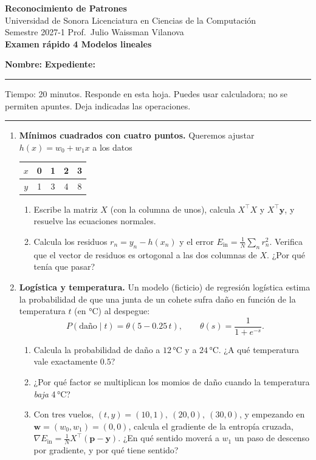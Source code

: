 \documentclass[11pt]{article}
\newcommand{\Ein}{E_{\text{in}}}
\newcommand{\vw}{\mathbf{w}}
\newcommand{\vy}{\mathbf{y}}
\newcommand{\T}{^{\top}}
\newcommand{\encabezado}[2]{%
\begin{center}
{\large\bfseries Reconocimiento de Patrones}\\[2pt]
Universidad de Sonora \textperiodcentered{} Licenciatura en Ciencias de la Computación\\
Semestre 2027-1 \textperiodcentered{} Prof.\ Julio Waissman Vilanova\\[10pt]
{\Large\bfseries #1}%
\ifdefined\tipodoc\\[4pt]{\large\itshape\tipodoc}\fi
\end{center}
\ifdefined\tipodoc\else
\vspace{6pt}
\textbf{Nombre:} \hrulefill\quad \textbf{Expediente:} \rule{3.5cm}{0.4pt}\par
\vspace{6pt}
\fi
#2
\par\medskip\hrule\medskip
}
\newcommand{\espacio}[1]{\par\vspace{#1}}
\newcommand{\nuevapagina}{\newpage}
\begin{document}
\encabezado{Examen rápido 4 \textperiodcentered{} Modelos lineales}{%
Tiempo: 20 minutos. Responde en esta hoja. Puedes usar calculadora; no se permiten apuntes. Deja indicadas las operaciones.}

\begin{enumerate}

\item \textbf{Mínimos cuadrados con cuatro puntos.} Queremos ajustar $h(x) = w_0 + w_1 x$ a los datos
\begin{center}
\begin{tabular}{c|cccc}
$x$ & 0 & 1 & 2 & 3 \\ \hline
$y$ & 1 & 3 & 4 & 8
\end{tabular}
\end{center}
\begin{enumerate}
  \item Escribe la matriz $X$ (con la columna de unos), calcula $X\T X$ y $X\T \vy$, y resuelve las ecuaciones normales.
  \espacio{4.5cm}

  \item Calcula los residuos $r_n = y_n - h(x_n)$ y el error $\Ein = \frac1N \sum_n r_n^2$. Verifica que el vector de residuos es ortogonal a las dos columnas de $X$. ¿Por qué tenía que pasar?
  \espacio{4cm}
\end{enumerate}

\nuevapagina
\item \textbf{Logística y temperatura.} Un modelo (ficticio) de regresión logística estima la probabilidad de que una junta de un cohete sufra daño en función de la temperatura $t$ (en °C) al despegue:
\[
P(\text{daño} \mid t) = \theta(5 - 0.25\, t), \qquad \theta(s) = \frac{1}{1 + e^{-s}} .
\]
\begin{enumerate}
  \item Calcula la probabilidad de daño a $12$\,°C y a $24$\,°C. ¿A qué temperatura vale exactamente $0.5$?
  \espacio{2.8cm}

  \item ¿Por qué factor se multiplican los momios de daño cuando la temperatura \emph{baja} 4\,°C?
  \espacio{2cm}

  \item Con tres vuelos, $(t, y) = (10, 1),\ (20, 0),\ (30, 0)$, y empezando en $\vw = (w_0, w_1) = (0, 0)$, calcula el gradiente de la entropía cruzada, $\nabla\Ein = \frac1N X\T(\mathbf p - \vy)$. ¿En qué sentido moverá a $w_1$ un paso de descenso por gradiente, y por qué tiene sentido?
  \espacio{3.5cm}
\end{enumerate}


\end{enumerate}
\end{document}
